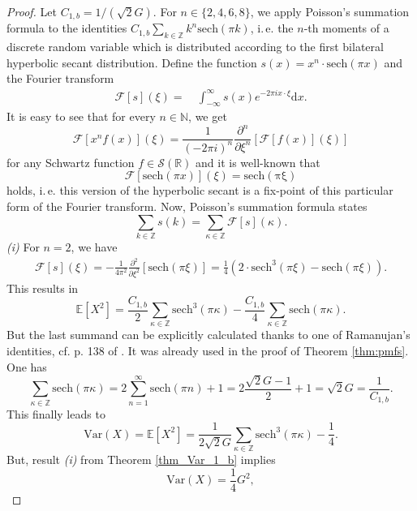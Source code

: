 \documentclass[12pt]{amsart}
\theoremstyle{definition}
\theoremstyle{remark}
\numberwithin{equation}{section}
\newcommand{\1}{\mathbbm{1}}
\begin{document}
\begin{proof}
Let $C_{1,b} = 1/(\sqrt{2}G)$. For $n \in \{2, 4, 6, 8\}$, we apply Poisson's summation formula to the identities $C_{1,b} \sum_{k\in\mathbb{Z}} k^{n} \mathrm{sech}(\pi k)$, i.\,e. the $n$-th moments of a discrete random variable which is distributed according to the first bilateral hyperbolic secant distribution. Define the function $s(x) = x^{n} \cdot \mathrm{sech}(\pi x)$ and the Fourier transform
\begin{align*}
\mathcal{F}[s](\xi) =&\ \int_{-\infty}^\infty s(x) e^{-2\pi i x \cdot \xi} \mathrm{d}x.
\end{align*}
It is easy to see that for every $n\in\mathbb{N}$, we get
$$
\mathcal{F}[x^n f(x)](\xi) = \frac{1}{(-2\pi i)^n} \frac{\partial^n}{\partial\xi^n} [\mathcal{F}[f(x)](\xi)]
$$
for any Schwartz function $f \in \mathcal{S}(\mathbb{R})$ and it is well-known that
$$
\mathcal{F}[\mathrm{sech}(\pi x)](\xi) = \mathrm{sech(\pi \xi)}
$$
holds, i.\,e. this version of the hyperbolic secant is a fix-point of this particular form of the Fourier transform. Now, Poisson's summation formula states
$$\sum_{k\in \mathbb{Z}}s(k) = \sum_{\kappa \in \mathbb{Z}}\mathcal{F}[s](\kappa).$$
\textit{(i)} For $n=2$, we have 
\begin{align*}
\mathcal{F}[s](\xi) = -\frac{1}{4 \pi ^2} \frac{\partial^2}{\partial\xi^2} [\mathrm{sech}(\pi \xi)]
= \frac{1}{4}(2 \cdot \mathrm{sech}^3(\pi \xi) - \mathrm{sech}(\pi \xi)). 
\end{align*}
This results in
$$
\mathbb{E}\left[X^2\right] = \frac{C_{1,b}}{2} \sum_{\kappa \in \mathbb{Z}} \mathrm{sech}^3(\pi \kappa) - \frac{C_{1,b}}{4} \sum_{\kappa \in \mathbb{Z}} \mathrm{sech}(\pi \kappa).
$$
But the last summand can be explicitly calculated thanks to one of Ramanujan's identities, cf. p. 138 of \cite{ramanujan_1991}. It was already used in the proof of Theorem \ref{thm:pmfs}. One has
$$
\sum_{\kappa \in \mathbb{Z}} \mathrm{sech}(\pi \kappa) = 2 \sum_{n=1}^\infty \mathrm{sech}(\pi n) + 1 = 2 \frac{\sqrt{2}G - 1}{2}  + 1 =\sqrt{2}G = \frac{1}{C_{1,b}}.
$$
This finally leads to
$$
\mathrm{Var}(X) = \mathbb{E}\left[X^2\right] = \frac{1}{2\sqrt{2}G} \sum_{\kappa \in \mathbb{Z}} \mathrm{sech}^3(\pi \kappa)  - \frac{1}{4}.
$$
But, result \textit{(i)} from Theorem \ref{thm_Var_1_b} implies 
$$
\mathrm{Var}(X) = \frac{1}{4}G^2,
$$
\end{proof}
\end{document}
